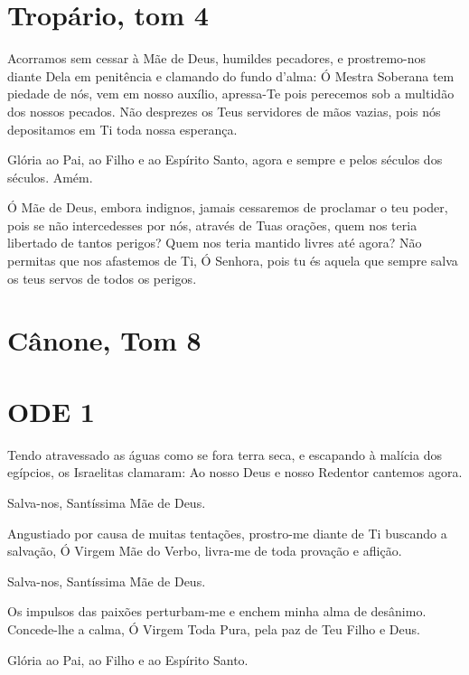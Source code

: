 \documentclass{subfiles}
\begin{document}
\pagestyle{empty}

\pagestyle{headings}

\section*{Tropário, tom 4}

Acorramos sem cessar à Mãe de Deus, humildes pecadores, e prostremo-nos diante
Dela em penitência e clamando do fundo d'alma: Ó Mestra Soberana tem piedade de
nós, vem em nosso auxílio, apressa-Te pois perecemos sob a multidão dos nossos
pecados. Não desprezes os Teus servidores de mãos vazias, pois nós depositamos
em Ti toda nossa esperança. 

Glória ao Pai, ao Filho e ao Espírito Santo, agora e sempre e pelos
séculos dos séculos. Amém.

Ó Mãe de Deus, embora indignos, jamais cessaremos de proclamar o
teu poder, pois se não intercedesses por nós, através de Tuas orações, quem
nos teria libertado de tantos perigos? Quem nos teria mantido livres até
agora? Não permitas que nos afastemos de Ti, Ó Senhora, pois tu és aquela
que sempre salva os teus servos de todos os perigos.

\section*{Cânone, Tom 8}

\section*{ODE 1}

\eirmos{}Tendo atravessado as águas como se fora terra seca, e
escapando à malícia dos egípcios, os Israelitas clamaram: Ao nosso Deus e
nosso Redentor cantemos agora.

Salva-nos, Santíssima Mãe de Deus.

Angustiado por causa de muitas tentações, prostro-me diante de Ti
buscando a salvação, Ó Virgem Mãe do Verbo, livra-me de toda provação e
aflição.

Salva-nos, Santíssima Mãe de Deus.

Os impulsos das paixões perturbam-me e enchem minha alma de
desânimo. Concede-lhe a calma, Ó Virgem Toda Pura, pela paz de Teu Filho e
Deus.

Glória ao Pai, ao Filho e ao Espírito Santo.
\end{document}
